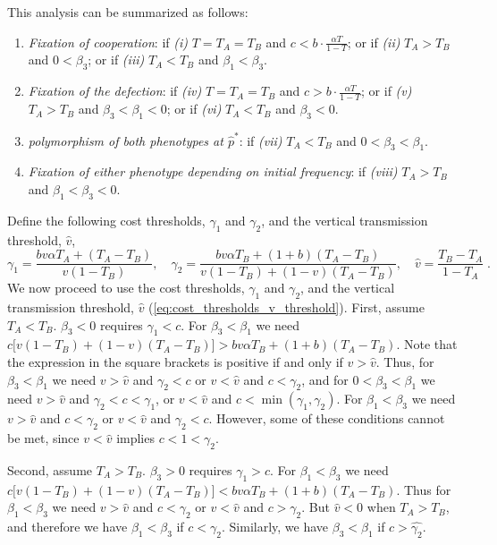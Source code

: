 \documentclass[12pt]{extarticle}
\begin{document}
This analysis can be summarized as follows:
\begin{enumerate}
\item \emph{Fixation of cooperation}: 
	if \emph{(i)} $T=T_A=T_B$ and $c < b\cdot \frac{\alpha T}{1-T}$; or
	if \emph{(ii)} $T_A>T_B$ and $0<\beta_3$; or 
	if \emph{(iii)} $T_A<T_B$ and $\beta_1<\beta_3$.
\item \emph{Fixation of the defection}: 
	if \emph{(iv)}  $T=T_A=T_B$ and $c > b\cdot \frac{\alpha T}{1-T}$; or 
	if \emph{(v)} $T_A>T_B$ and $\beta_3<\beta_1<0$; or 
	if \emph{(vi)} $T_A<T_B$ and $\beta_3<0$.
\item \emph{polymorphism of both phenotypes at $\hat{p}^*$}: 
	if \emph{(vii)} $T_A < T_B$ and $0<\beta_3<\beta_1$.
\item \emph{Fixation of either phenotype depending on initial frequency}:
	if \emph{(viii)}  $T_A>T_B$ and $\beta_1<\beta_3<0$.
\end{enumerate}

Define the following cost thresholds, $\gamma_1$ and $\gamma_2$, and the vertical transmission threshold, $\hat v$,
\begin{equation} \label{eq:cost_thresholds_v_threshold} 
\gamma_1 = \frac{b v \alpha T_A + (T_A - T_B)}{v(1-T_B)}, \quad
\gamma_2 = \frac{b v \alpha T_B + (1+b) (T_A - T_B)}{v(1-T_B) + (1-v)(T_A-T_B)}, \quad
\hat v = \frac{T_B - T_A}{1-T_A} \;.
\end{equation}
We now proceed to use the cost thresholds, $\gamma_1$ and $\gamma_2$, and the vertical transmission threshold, $\hat v$ (\autoref{eq:cost_thresholds_v_threshold}).
First, assume $T_A<T_B$.
$\beta_3<0$ requires $\gamma_1<c$.
For $\beta_3<\beta_1$ we need $c\big[v(1-T_B) + (1-v)(T_A-T_B)\big] > bv\alpha T_B + (1+b)(T_A-T_B)$.
Note that the expression in the square brackets is positive if and only if $v > \hat v$.
Thus, for $\beta_3<\beta_1$ we need $v > \hat v$ and $\gamma_2 < c$ or $v < \hat v$ and $c < \gamma_2$,
and for $0<\beta_3<\beta_1$ we need $v > \hat v$ and $\gamma_2 < c < \gamma_1$, or $v < \hat v$ and $c < \min(\gamma_1, \gamma_2)$. For $\beta_1<\beta_3$ we need $v > \hat v$ and $c<\gamma_2$ or $v < \hat v$ and $\gamma_2<c$.
However, some of these conditions cannot be met, since $v < \hat v$ implies $c<1<\gamma_2$.

Second, assume $T_A>T_B$.
$\beta_3>0$ requires $\gamma_1 > c$. 
For $\beta_1<\beta_3$ we need $c\big[v(1-T_B) + (1-v)(T_A-T_B)\big] < bv\alpha T_B + (1+b)(T_A-T_B)$.
Thus for $\beta_1<\beta_3$ we need $v > \hat v$ and $c < \gamma_2 $ or $v < \hat v$ and $c > \gamma_2$.
But $\hat{v}<0$ when $T_A > T_B$, and therefore we have $\beta_1<\beta_3$ if $c < \gamma_2$. Similarly, we have $\beta_3<\beta_1$ if $c > \hat{\gamma_2}$.
\end{document}
